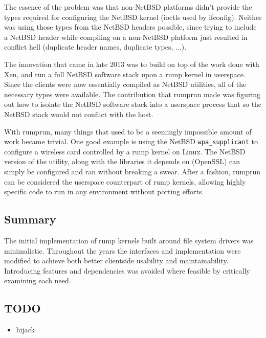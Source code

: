 The essence of the problem was that non-NetBSD platforms didn't provide
the types required for configuring the NetBSD kernel (\eg ioctls used
by ifconfig).  Neither was using those types from the NetBSD headers
possible, since trying to include a NetBSD header while compiling on
a non-NetBSD platform just resulted in conflict hell (duplicate header
names, duplicate types, ...).

The innovation that came in late 2013 was to build on top of the work
done with Xen, and run a full NetBSD software stack upon a rump kernel
in userspace.  Since the clients were now essentially compiled as NetBSD
utilities, all of the necessary types were available.  The contribution
that rumprun made was figuring out how to isolate the NetBSD software
stack into a userspace process that so the NetBSD stack would not conflict
with the host.

With rumprun, many things that used to be a seemingly impossible
amount of work became trivial.  One good example is using the NetBSD
\verb+wpa_supplicant+ to configure a wireless card controlled by a rump
kernel on Linux.  The NetBSD version of the utility, along with the
libraries it depends on (\eg OpenSSL) can simply be configured and ran
without breaking a swear.  After a fashion, rumprun can be considered
the userspace counterpart of rump kernels, allowing highly specific code
to run in any environment without porting efforts.


\subsection{Summary}

The initial implementation of rump kernels built around file system
drivers was minimalistic.  Throughout the years the interfaces and
implementation were modified to achieve both better clientside usability
and maintainability.  Introducing features and dependencies was avoided
where feasible by critically examining each need.


\subsection{TODO}

\begin{itemize}
\item	hijack
\end{itemize}

